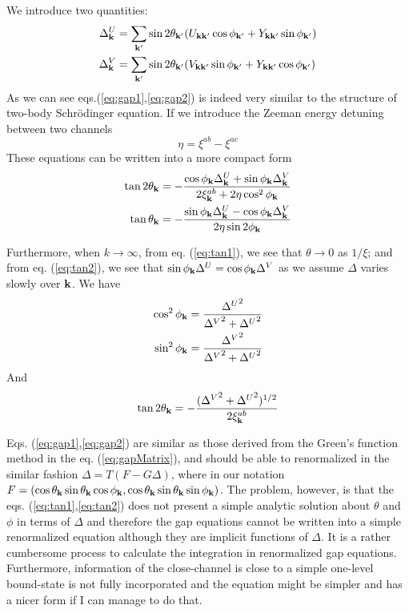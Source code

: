 We introduce two quantities:
\begin{align}
\Delta_{\mathbf{k}}^U&=\sum_{\mathbf{k}'}\sin2\theta_{\mathbf{k}'}(U_{\mathbf{k}\mathbf{k}'}\cos\phi_{\mathbf{k}'}+Y_{\mathbf{k}\mathbf{k}'}\sin\phi_{\mathbf{k}'})\label{eq:gap1}\\
\Delta_{\mathbf{k}}^V&=\sum_{\mathbf{k}'}\sin2\theta_{\mathbf{k}'}(V_{\mathbf{k}\mathbf{k}'}\sin\phi_{\mathbf{k}'}+Y_{\mathbf{k}\mathbf{k}'}\cos\phi_{\mathbf{k}'})\label{eq:gap2}
\end{align} 
As we can see eqs.(\ref{eq:gap1},\ref{eq:gap2}) is indeed very similar to the structure of two-body Schr\"{o}‌dinger equation.
If we ‌introduce the Zeeman energy detuning between two channels
\begin{equation}
\eta=\xi^{ab}-\xi^{ac}
\end{equation}
These equations can be written into a more compact form
\begin{align}
\tan2\theta_{\mathbf{k}}&=-\frac{\cos\phi_{\mathbf{k}}\Delta^U_{\mathbf{k}}+\sin\phi_{\mathbf{k}}\Delta^V_{\mathbf{k}}}{2\xi^{ab}_{\mathbf{k}}+2\eta\cos^2\phi_{\mathbf{k}}}\label{eq:tan1}\\
\tan\theta_{\mathbf{k}}&=-\frac{\sin\phi_{\mathbf{k}}\Delta^U_{\mathbf{k}}-\cos\phi_{\mathbf{k}}\Delta^V_{\mathbf{k}}}{2\eta\sin2\phi_{\mathbf{k}}}\label{eq:tan2}
\end{align} 


Furthermore, when $k\rightarrow\infty$, from eq. (\ref{eq:tan1}), we see that $\theta\rightarrow0$ as $1/\xi$;  and from eq. (\ref{eq:tan2}), we see that $\sin\phi_{\mathbf{k}}\Delta^U=\cos\phi_{\mathbf{k}}\Delta^V$ as we assume $\Delta$ varies slowly over $\mathbf{k}$.  We have 
\begin{align*}
\cos^2\phi_{\mathbf{k}}&=\frac{{\Delta^U}^2}{{\Delta^V}^2+{\Delta^U}^2}\\
\sin^2\phi_{\mathbf{k}}&=\frac{{\Delta^V}^2}{{\Delta^V}^2+{\Delta^U}^2}
\end{align*}
And 
\[\tan2\theta_{\mathbf{k}}=-\frac{({{\Delta^V}^2+{\Delta^U}^2})^{1/2}}{2\xi^{ab}_{\mathbf{k}}}\]

Eqs. (\ref{eq:gap1},\ref{eq:gap2}) are similar as those derived from the Green's function method in the eq. (\ref{eq:gapMatrix}), and should be able to renormalized in the similar fashion $\Delta=T(F-G\Delta)$, where in our notation $F=(\cos\theta_{\mathbf{k}}\sin\theta_{\mathbf{k}}\cos\phi_{\mathbf{k}},\cos\theta_{\mathbf{k}}\sin\theta_{\mathbf{k}}\sin\phi_{\mathbf{k}})$.  The problem, however, is that the eqs. (\ref{eq:tan1},\ref{eq:tan2}) does not present a simple analytic solution about $\theta$ and $\phi$ in terms of $\Delta$ and therefore the gap equations cannot be written into a simple renormalized  equation although they are implicit functions of $\Delta$.
 It is a rather cumbersome process to calculate the integration in renormalized gap equations.  Furthermore, information of the close-channel is close to a simple one-level bound-state is not fully incorporated and the equation might be simpler and has a nicer form if I can manage to do that.  

